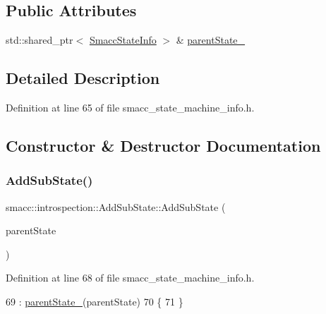 \subsection*{Public Attributes}
\begin{DoxyCompactItemize}
\item 
std\+::shared\+\_\+ptr$<$ \hyperlink{classsmacc_1_1introspection_1_1SmaccStateInfo}{Smacc\+State\+Info} $>$ \& \hyperlink{structsmacc_1_1introspection_1_1AddSubState_a17bd7a0edd62758b94907ecc3644cd29}{parent\+State\+\_\+}
\end{DoxyCompactItemize}


\subsection{Detailed Description}


Definition at line 65 of file smacc\+\_\+state\+\_\+machine\+\_\+info.\+h.



\subsection{Constructor \& Destructor Documentation}
\mbox{\label{structsmacc_1_1introspection_1_1AddSubState_a9556919fdfce601d7746c8f3efcf298b}} 
\subsubsection{\texorpdfstring{Add\+Sub\+State()}{AddSubState()}}
{\footnotesize\ttfamily smacc\+::introspection\+::\+Add\+Sub\+State\+::\+Add\+Sub\+State (\begin{DoxyParamCaption}\item[{std\+::shared\+\_\+ptr$<$ \hyperlink{classsmacc_1_1introspection_1_1SmaccStateInfo}{Smacc\+State\+Info} $>$ \&}]{parent\+State }\end{DoxyParamCaption})\hspace{0.3cm}{\ttfamily [inline]}}



Definition at line 68 of file smacc\+\_\+state\+\_\+machine\+\_\+info.\+h.


\begin{DoxyCode}
69         : \hyperlink{structsmacc_1_1introspection_1_1AddSubState_a17bd7a0edd62758b94907ecc3644cd29}{parentState\_}(parentState)
70     \{
71     \}
\end{DoxyCode}


